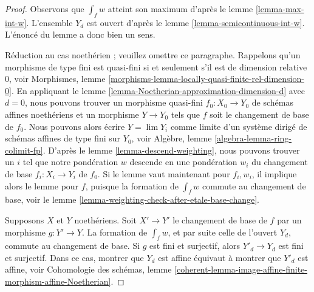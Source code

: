 \begin{proof}
Observons que $\int_f w$ atteint son maximum d'après le lemme \ref{lemma-max-int-w}.
L'ensemble $Y_d$ est ouvert d'après le lemme \ref{lemma-semicontinuous-int-w}.
L'énoncé du lemme a donc bien un sens.

\medskip\noindent
Réduction au cas noethérien ; veuillez omettre ce paragraphe.
Rappelons qu'un morphisme de type fini est quasi-fini si et seulement
s'il est de dimension relative $0$, voir
Morphismes, lemme \ref{morphisms-lemma-locally-quasi-finite-rel-dimension-0}.
En appliquant le lemme \ref{lemma-Noetherian-approximation-dimension-d}
avec $d = 0$, nous pouvons trouver un morphisme quasi-fini $f_0 : X_0 \to Y_0$
de schémas affines noethériens et un morphisme $Y \to Y_0$ tels que $f$
soit le changement de base de $f_0$. Nous pouvons alors écrire $Y = \lim Y_i$ comme limite
d'un système dirigé de schémas affines de type fini sur $Y_0$, voir
Algèbre, lemme \ref{algebra-lemma-ring-colimit-fp}.
D'après le lemme \ref{lemma-descend-weighting},
nous pouvons trouver un $i$ tel que notre pondération $w$
descende en une pondération $w_i$ du changement de base $f_i : X_i \to Y_i$
de $f_0$. Si le lemme vaut maintenant pour $f_i, w_i$, il implique
alors le lemme pour $f$, puisque la formation de $\int_f w$ commute au
changement de base, voir le lemme \ref{lemma-weighting-check-after-etale-base-change}.

\medskip\noindent
Supposons $X$ et $Y$ noethériens. Soit $X' \to Y'$ le changement de base de $f$
par un morphisme $g : Y' \to Y$. La formation de $\int_f w$, et par suite
celle de l'ouvert $Y_d$, commute au changement de base. Si $g$ est fini et surjectif, alors
$Y'_d \to Y_d$ est fini et surjectif. Dans ce cas, montrer que
$Y_d$ est affine équivaut à montrer que $Y'_d$ est affine, voir
Cohomologie des schémas, lemme
\ref{coherent-lemma-image-affine-finite-morphism-affine-Noetherian}.


\end{proof}
